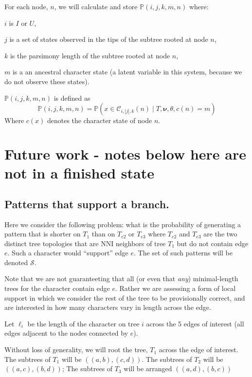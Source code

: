 \documentclass[11pt]{article}
\newcommand{\inform}{\ensuremath{I}\xspace}
\newcommand{\uninform}{\ensuremath{U}\xspace}
\newcommand{\edgeLengths}{\ensuremath{\bm \nu}\xspace}
\newcommand{\patProbSym}{\ensuremath{\mathbb P}\xspace}
\renewcommand{\Pr}{\patProbSym}
\newcommand{\patProb}[5]{\ensuremath{\patProbSym(#1,#2,#3,#4,#5)}\xspace}
\newcommand{\patClassSym}{\ensuremath{\mathcal C}\xspace}
\newcommand{\patClass}[3]{\ensuremath{\patClassSym_{#1,#2,#3}}\xspace}
\newcommand{\stateOf}[1]{\ensuremath{c(#1)}\xspace}
\begin{document}
For each node, $n$, we will calculate and store \patProb{i}{j}{k}{m}{n} where:
\begin{compactitem}
	\item $i$ is \inform  or \uninform,
	\item $j$ is a set of states observed in the tips of the subtree rooted at node $n$,
	\item $k$ is the parsimony length of the subtree rooted at node $n$,
	\item $m$ is a an ancestral character state (a latent variable in this system, because we do not observe these states).
\end{compactitem}
\patProb{i}{j}{k}{m}{n} is defined as
\begin{equation}
	\patProb{i}{j}{k}{m}{n} = \Pr\left(x\in\patClass{i}{|j|}{k}(n) \mid T, \edgeLengths, \theta, \stateOf{n}=m\right)
\end{equation}
Where \stateOf{x} denotes the character state of node $n$.





\section*{{\color{red}Future work - notes below here are not in a finished state}}
\subsection*{Patterns that support a branch.}
Here we consider the following problem: what is the probability of generating a pattern that is shorter on $T_1$ than on $T_{e2}$ or $T_{e3}$ where $T_{e2}$ and $T_{e3}$ are the two distinct tree topologies that are NNI neighbors of tree $T_1$ but do not contain edge $e$.
Such a character would ``support'' edge $e$.
The set of such patterns will be denoted $\mathcal{S}$.

Note that we are not guaranteeting that all (or even that {\em any}) minimal-length trees  for the character contain edge $e$. 
Rather we are assessing a form of local support in which we consider the rest of the tree to be provisionally correct, and are interested in how many characters vary in length across the edge.


Let $\ell_i$ be the length of the character on tree $i$ across the 5 edges of interest (all edges adjacent to the nodes connected by $e$).

Without loss of generality, we will root the tree, $T_1$ across the edge of interest.
The subtrees of $T_1$ will be $((a,b),(c,d))$. The subtrees of $T_2$ will be $((a,c),(b,d))$; The subtrees of $T_3$ will be arranged $((a,d),(b,c))$
\end{document}
